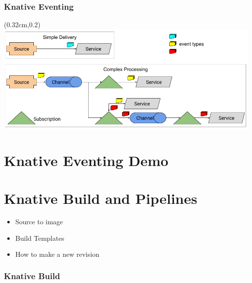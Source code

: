\documentclass[aspectratio=169,11pt,hyperref={colorlinks=true}]{beamer}
\begin{document}
\begin{lblackrwhiteframe}
\begin{lblackrwhiteframe}
\begin{tblackbgrayframe}
  \frametitle{Knative Eventing}
  \begin{textblock*}{\paperwidth}(0.32cm,0.2\paperheight)
    \centering
    \includegraphics[width=0.9\paperwidth]{img/eventing-control-plane.png}
  \end{textblock*}
\end{tblackbgrayframe}

\section{Knative Eventing Demo}

\section{Knative Build and Pipelines}

\begin{2columnsframe}
  {
  \begin{itemize}
    \item Source to image
    \item Build Templates
    \item How to make a new revision
  \end{itemize}
  }
  {
  
  }
  \frametitle{Knative Build}
\end{2columnsframe}


\end{lblackrwhiteframe}
\end{lblackrwhiteframe}
\end{document}
